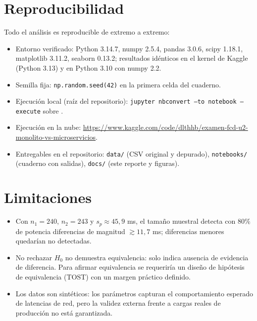 \documentclass[12pt,a4paper]{article}
\begin{document}
\section{Reproducibilidad}
Todo el análisis es reproducible de extremo a extremo:
\begin{itemize}
\item Entorno verificado: Python 3.14.7, numpy 2.5.4, pandas 3.0.6, scipy 1.18.1, matplotlib 3.11.2, seaborn 0.13.2; resultados idénticos en el kernel de Kaggle (Python 3.13) y en Python 3.10 con numpy 2.2.
\item Semilla fija: \texttt{np.random.seed(42)} en la primera celda del cuaderno.
\item Ejecución local (raíz del repositorio): \texttt{jupyter nbconvert --to notebook --execute} sobre .
\item Ejecución en la nube: \url{https://www.kaggle.com/code/dlthhb/examen-fcd-u2-monolito-vs-microservicios}.
\item Entregables en el repositorio: \texttt{data/} (CSV original y depurado), \texttt{notebooks/} (cuaderno con salidas), \texttt{docs/} (este reporte y figuras).
\end{itemize}

\section{Limitaciones}
\begin{itemize}
\item Con $n_1=240$, $n_2=243$ y $s_p\approx45{,}9$ ms, el tamaño muestral detecta con 80\% de potencia diferencias de magnitud $\gtrsim11{,}7$ ms; diferencias menores quedarían no detectadas.
\item No rechazar $H_0$ no demuestra equivalencia: solo indica ausencia de evidencia de diferencia. Para afirmar equivalencia se requeriría un diseño de hipótesis de equivalencia (TOST) con un margen práctico definido.
\item Los datos son sintéticos: los parámetros capturan el comportamiento esperado de latencias de red, pero la validez externa frente a cargas reales de producción no está garantizada.
\end{itemize}
\end{document}
